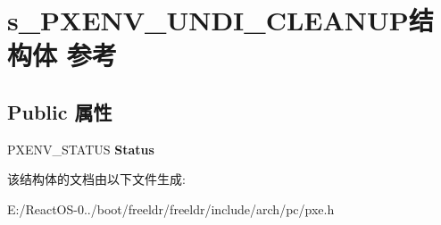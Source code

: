\hypertarget{structs___p_x_e_n_v___u_n_d_i___c_l_e_a_n_u_p}{}\section{s\+\_\+\+P\+X\+E\+N\+V\+\_\+\+U\+N\+D\+I\+\_\+\+C\+L\+E\+A\+N\+U\+P结构体 参考}
\label{structs___p_x_e_n_v___u_n_d_i___c_l_e_a_n_u_p}
\subsection*{Public 属性}
\begin{DoxyCompactItemize}
\item 
\mbox{\label{structs___p_x_e_n_v___u_n_d_i___c_l_e_a_n_u_p_a386c0f52fac5985b75ef4ff04d3f101e}} 
P\+X\+E\+N\+V\+\_\+\+S\+T\+A\+T\+US {\bfseries Status}
\end{DoxyCompactItemize}


该结构体的文档由以下文件生成\+:\begin{DoxyCompactItemize}
\item 
E\+:/\+React\+O\+S-\/0../boot/freeldr/freeldr/include/arch/pc/pxe.\+h\end{DoxyCompactItemize}
